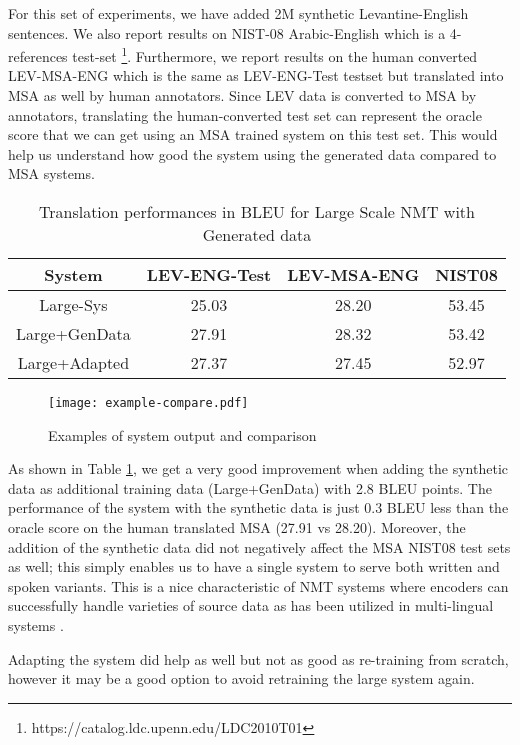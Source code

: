\documentclass[a4paper]{article}
\begin{document}
 For this set of experiments, we have added 2M synthetic  Levantine-English sentences.
We also report results on NIST-08 Arabic-English which is a 4-references test-set \footnote{https://catalog.ldc.upenn.edu/LDC2010T01}. Furthermore, we report results on the human converted LEV-MSA-ENG which is the same as LEV-ENG-Test testset but translated into MSA as well by human annotators.  Since LEV data is converted to MSA by annotators, translating the human-converted test set can  represent the oracle score that we can get using an MSA trained system on this test set. This would help us understand how good the system using the generated data compared to MSA systems.

\begin{table}
{\small
\begin{center}
\begin{tabular}{c|c|c|c}
System & LEV-ENG-Test  & LEV-MSA-ENG & NIST08 \\
\hline
Large-Sys & 25.03  & 28.20 & 53.45 \\
Large+GenData & 27.91 &  28.32 & 53.42 \\
Large+Adapted & 27.37 & 27.45 & 52.97  \\ 
\end{tabular}
\end{center}
\caption{Translation performances in BLEU for Large Scale NMT with Generated data
\label{tab:nmt-lg}}
}
\end{table}

\begin{figure*}[t]
	\centering
		\texttt{[image: example-compare.pdf]}
	\label{fig:example-compare}
	\caption{Examples of system output and comparison}
\end{figure*}

As shown in Table \ref{tab:nmt-lg}, we get a very good improvement when adding the synthetic data as additional training data (Large+GenData) with 2.8 BLEU points. The performance of the system with the synthetic data is just 0.3 BLEU less than the oracle score on the human translated MSA (27.91 vs 28.20). Moreover, the addition of the synthetic data did not negatively affect the MSA NIST08 test sets as well; this simply enables us to have a single system to serve both written and spoken variants. This is a nice characteristic of NMT systems where  encoders can successfully handle varieties of source data as has been utilized in multi-lingual systems \cite{FiratCB16}.

   Adapting the system did help as well but not as good as re-training from scratch, however it may be a good option to avoid retraining the large system again.
\end{document}
